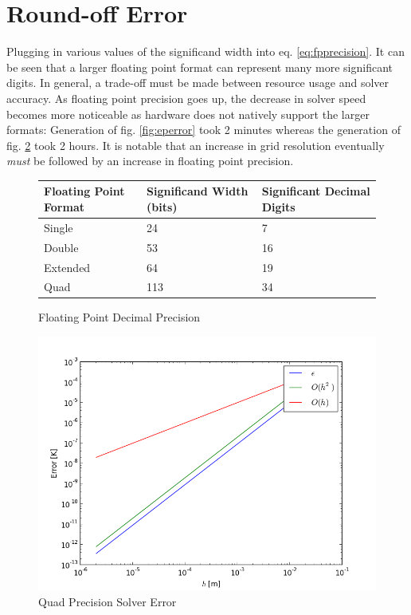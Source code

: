 \documentclass[12pt,twocolumn]{article}
\begin{document}
\section*{Round-off Error}
Plugging in various values of the significand width into eq. \eqref{eq:fpprecision}. It can be seen that a larger floating point format can represent 
many more significant digits. In general, a trade-off must be made between resource usage and solver accuracy. As floating point precision goes up, the decrease in
solver speed becomes more noticeable as hardware does not natively support the larger formats: Generation of fig. \ref{fig:eperror} took 2 minutes whereas the generation of fig. \ref{fig:qperror} took 2 hours.
It is notable that an increase in grid resolution eventually \emph{must} be followed by an increase in floating point precision.

\begin{figure}\begin{center}\begin{tabularx}{\columnwidth}{|X|X|X|}
\hline
Floating Point Format & Significand Width (bits) & Significant Decimal Digits \\\hline
Single & 24 & 7\\\hline
Double & 53 & 16\\\hline
Extended & 64 & 19\\\hline
Quad & 113 & 34\\\hline
\end{tabularx}\end{center}\label{fg:fpprecision}
\caption{Floating Point Decimal Precision}
\end{figure}

\begin{figure}
\includegraphics[width=\columnwidth]{plots/qperror.png}
\caption{Quad Precision Solver Error}
\label{fig:qperror}
\end{figure}
\end{document}
